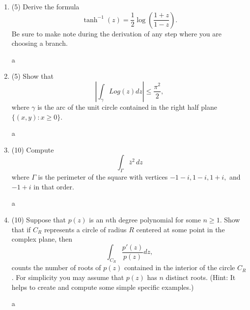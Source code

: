\documentclass[12pt]{article}
\begin{document}
\begin{enumerate}
\item (5) Derive the formula \[\tanh^{-1}(z)=\frac{1}{2}\log\left ( \frac{1+z}{1-z}\right ).\] Be sure to make note during the derivation of any step where you are choosing a branch.

\begin{mdframed}
  a
\end{mdframed}

\item (5)  Show that
\[
\left | \int_{\gamma}Log (z)dz\right |\leq \frac{\pi^2}{2},
\]
where $\gamma$ is the arc of the unit circle contained in the right half plane $\{(x,y): x\geq 0\}$.

\begin{mdframed}
  a
\end{mdframed}

\item (10) Compute $$\int_{\Gamma}\overline{z}^2\,dz$$ where $\Gamma$ is the perimeter of the square with vertices $-1-i, 1-i,1+i,$ and $-1+i$ in that order.

\begin{mdframed}
  a
\end{mdframed}

\item (10) Suppose that $p(z)$ is an $n$th degree polynomial for some $n\geq 1$. Show that if $C_R$ represents a circle of radius $R$ centered at some point in the complex plane, then
    \[
    \int_{C_R}\frac{p'(z)}{p(z)}dz,
    \]
    counts the number of roots of $p(z)$ contained in the interior of the circle $C_R$. For simplicity you may assume that $p(z)$ has $n$ distinct roots. (Hint: It helps to create and compute some simple specific examples.)

\begin{mdframed}
  a
\end{mdframed}

\end{enumerate}
\end{document}
